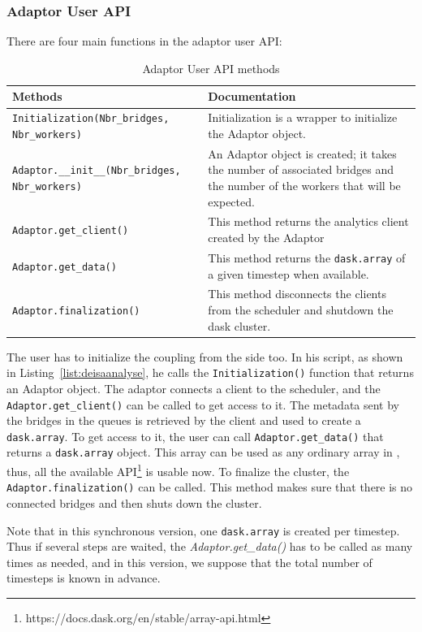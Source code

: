 \subsubsection{\deisa Adaptor User API}
There are four main functions in the \deisa adaptor user API: 
\begin{table}[ht]  
\begin{tabular}{||  m{6cm}  m{9cm} ||} 
 \hline
Methods & Documentation\\
 \hline\hline
 \texttt{Initialization(Nbr\_bridges, Nbr\_workers) }& Initialization is a wrapper to initialize the Adaptor object.\\ 
 \hline\hline  
\texttt{Adaptor.\_\_init\_\_(Nbr\_bridges, Nbr\_workers)} & An Adaptor object is created; it takes the number of associated bridges and the number of the workers that will be expected. \\ 
 \hline\hline
 \texttt{Adaptor.get\_client()} & This method returns the analytics client created by the Adaptor\\
 \hline\hline
 \texttt{Adaptor.get\_data()} & This method returns the \texttt{dask.array} of a given timestep when available.\\
 \hline\hline
 \texttt{Adaptor.finalization()} &   This method disconnects the clients from the scheduler and shutdown the dask cluster. \\
 \hline
\end{tabular}
\caption{Adaptor User API methods}
\label{table:adaptor}
\end{table}

The user has to initialize the coupling from the \dask side too. In his script, as shown in Listing~\ref{list:deisaanalyse}, he calls the \texttt{Initialization()} function that returns an Adaptor object. The adaptor connects a client to the scheduler, and the \texttt{Adaptor.get\_client()} can be called to get access to it. The metadata sent by the bridges in the queues is retrieved by the client and used to create a \texttt{dask.array}. To get access to it, the user can call \texttt{Adaptor.get\_data()} that returns a \texttt{dask.array} object. This array can be used as any ordinary array in \dask, thus, all the available API\footnote{https://docs.dask.org/en/stable/array-api.html} is usable now.  
To finalize the \dask cluster, the \texttt{Adaptor.finalization()} can be called. This method makes sure that there is no connected bridges and then shuts down the cluster. 

Note that in this synchronous version, one \texttt{dask.array} is created per timestep. Thus if several steps are waited, the \textit{Adaptor.get\_data()} has to be called as many times as needed, and in this version, we suppose that the total number of timesteps is known in advance.

